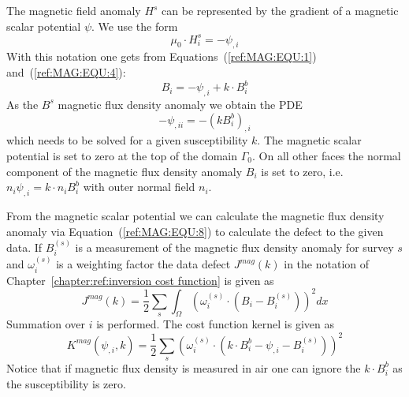 The magnetic field anomaly $H^s$ can be represented by the gradient of a
magnetic scalar potential $\psi$.
We use the form 
\begin{equation}\label{ref:MAG:EQU:6}
\mu_0  \cdot H^s_i = - \psi_{,i}
\end{equation}
With this notation one gets from Equations~(\ref{ref:MAG:EQU:1}) and~(\ref{ref:MAG:EQU:4}):
\begin{equation}\label{ref:MAG:EQU:7}
B_i = - \psi_{,i}  + k \cdot B^b_i
\end{equation}
As the $B^s$ magnetic flux density anomaly we obtain the PDE
\begin{equation}\label{ref:MAG:EQU:8}
- \psi_{,ii} = - (k B^b_i)_{,i} 
\end{equation} 
which needs to be solved for a given susceptibility $k$.
The magnetic scalar potential is set to zero at the top of the domain
$\Gamma_{0}$.
On all other faces the normal component of the magnetic flux density anomaly
$B_i$ is set to zero, i.e. $n_i \psi_{,i} = k \cdot n_i  B^b_i$ with outer
normal field $n_i$.

From the magnetic scalar potential we can calculate the magnetic flux density
anomaly via Equation~(\ref{ref:MAG:EQU:8}) to calculate the defect to the given
data.
If $B^{(s)}_i$ is a measurement of the magnetic flux density anomaly for
survey $s$ and $\omega^{(s)}_i$ is a weighting factor the data defect
$J^{mag}(k)$ in the notation of Chapter~\ref{chapter:ref:inversion cost function} is given as
\begin{equation}\label{ref:MAG:EQU:9}
J^{mag}(k) = \frac{1}{2}\sum_{s} \int_{\Omega} ( \omega^{(s)}_i \cdot (B_{i}- B^{(s)}_i) ) ^2 dx
\end{equation} 
Summation over $i$ is performed.
The cost function kernel is given as
\begin{equation}\label{ref:MAG:EQU:10}
K^{mag}(\psi_{,i},k) = \frac{1}{2}\sum_{s} ( \omega^{(s)}_i \cdot (k \cdot B^b_i - \psi_{,i} - B^{(s)}_i) ) ^2
\end{equation} 
Notice that if magnetic flux density is measured in air one can ignore the
$k\cdot B^b_i$ as the susceptibility is zero.

